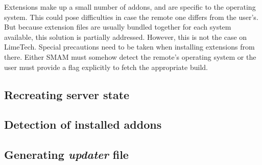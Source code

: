 Extensions make up a small number of addons, and are specific to the operating system.
This could pose difficulties in case the remote one differs from the user's.
But because extension files are usually bundled together for each system available, this solution is partially addressed.
However, this is not the case on LimeTech.
Special precautions need to be taken when installing extensions from there.
Either SMAM must somehow detect the remote's operating system or the user must provide a flag explicitly to fetch the appropriate build.

\subsection{Recreating server state}

\subsection{Detection of installed addons}

\subsection{Generating \textit{updater} file}

